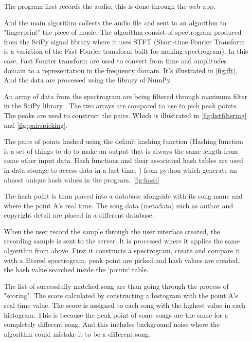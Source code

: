 The program first records the audio, this is done through the web app.  


And the main algorithm collects the audio file and sent to an algorithm to "fingerprint" the piece of music. The algorithm consist of spectrogram produced from the SciPy signal library \cite{virtanen_scipy_2020} where it uses STFT (Short-time Fourier Transform is a variation of the Fast Fourier transform built for making spectrogram). In this case, Fast Fourier transform are used to convert from time and amplitudes domain to a representation in the frequency domain. It's illustrated in \autoref{fig:fft}. \cite{noauthor_fast_2025} And the data are processed using the library of NumPy\cite{harris_array_2020}. 


An array of data from the spectrogram are being filtered through maximum filter in the SciPy library \cite{virtanen_scipy_2020}. The two arrays are compared to use to pick peak points. The peaks are used to construct the pairs. Which is illustrated in \autoref{fig:listfiltering} and \autoref{fig:pairspicking}.

The pairs of points hashed using the default hashing function (Hashing function is a set of things to do to make an output that is always the same length from some other input data. Hash functions and their associated hash tables are used in data storage to access data in a fast time. \cite{noauthor_hash_2024}) from python which generate an almost unique hash values in the program. \autoref{fig:hash}


The hash point is than placed into a database alongside with its song name and where the point A's real time. The song data (metadata) such as author and copyright detail are placed in a different database.

When the user record the sample through the user interface created, the recording sample is sent to the server. It is processed where it applies the same algorithm from above. First it constructs a spectrogram, create and compare it with a filtered spectrogram, peak point are picked and hash values are created, the hash value searched inside the `points` table. 

The list of successfully matched song are than going through the process of "scoring". The score calculated by constructing a histogram with the point A's real time value. The score is assigned to each song with the highest value in each histogram. This is because the peak point of some songs are the same for a completely different song. And this includes background noise where the algorithm could mistake it to be a different song.

